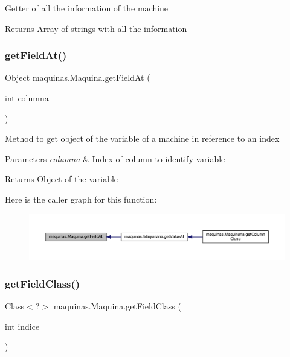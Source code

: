 Getter of all the information of the machine

\begin{DoxyReturn}{Returns}
Array of strings with all the information 
\end{DoxyReturn}
\mbox{\label{classmaquinas_1_1_maquina_ab9e0a71d979ac6b404b2b92697d90bed}} 
\subsubsection{\texorpdfstring{get\+Field\+At()}{getFieldAt()}}
{\footnotesize\ttfamily Object maquinas.\+Maquina.\+get\+Field\+At (\begin{DoxyParamCaption}\item[{int}]{columna }\end{DoxyParamCaption})}

Method to get object of the variable of a machine in reference to an index


\begin{DoxyParams}{Parameters}
{\em columna} & Index of column to identify variable \\
\hline
\end{DoxyParams}
\begin{DoxyReturn}{Returns}
Object of the variable 
\end{DoxyReturn}
Here is the caller graph for this function\+:
\nopagebreak
\begin{figure}[H]
\begin{center}
\leavevmode
\includegraphics[width=350pt]{classmaquinas_1_1_maquina_ab9e0a71d979ac6b404b2b92697d90bed_icgraph}
\end{center}
\end{figure}
\mbox{\label{classmaquinas_1_1_maquina_ade3b0837e2f5242909de159b98c3f6a1}} 
\subsubsection{\texorpdfstring{get\+Field\+Class()}{getFieldClass()}}
{\footnotesize\ttfamily Class$<$?$>$ maquinas.\+Maquina.\+get\+Field\+Class (\begin{DoxyParamCaption}\item[{int}]{indice }\end{DoxyParamCaption})}

